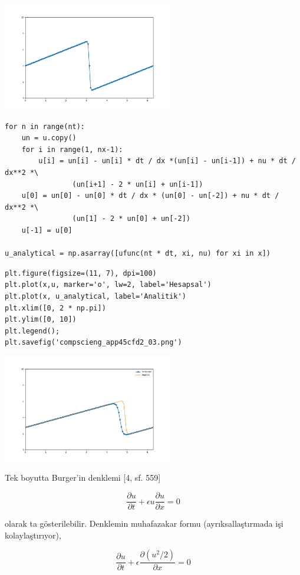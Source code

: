 \documentclass[12pt,fleqn]{article}\usepackage{../../common}
\begin{document}
\includegraphics[width=20em]{compscieng_app45cfd2_02.png}

\begin{verbatim}
for n in range(nt):
    un = u.copy()
    for i in range(1, nx-1):
        u[i] = un[i] - un[i] * dt / dx *(un[i] - un[i-1]) + nu * dt / dx**2 *\
                (un[i+1] - 2 * un[i] + un[i-1])
    u[0] = un[0] - un[0] * dt / dx * (un[0] - un[-2]) + nu * dt / dx**2 *\
                (un[1] - 2 * un[0] + un[-2])
    u[-1] = u[0]
        
u_analytical = np.asarray([ufunc(nt * dt, xi, nu) for xi in x])
\end{verbatim}

\begin{verbatim}
plt.figure(figsize=(11, 7), dpi=100)
plt.plot(x,u, marker='o', lw=2, label='Hesapsal')
plt.plot(x, u_analytical, label='Analitik')
plt.xlim([0, 2 * np.pi])
plt.ylim([0, 10])
plt.legend();
plt.savefig('compscieng_app45cfd2_03.png')
\end{verbatim}


\includegraphics[width=20em]{compscieng_app45cfd2_03.png}

Tek boyutta Burger'in denklemi [4, sf. 559]

$$
\frac{\partial u}{\partial t} + \epsilon u \frac{\partial u}{\partial x} = 0
$$

olarak ta gösterilebilir. Denklemin muhafazakar formu (ayrıksallaştırmada işi
kolaylaştırıyor),

$$
\frac{\partial u}{\partial t} + \epsilon \frac{\partial (u^2 / 2)}{\partial x} = 0
$$
\end{document}
